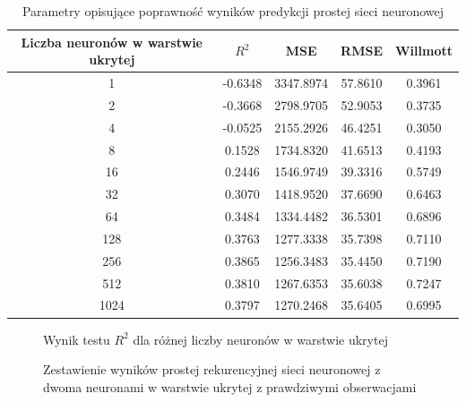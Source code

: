 \documentclass[10pt,a4paper]{article}
\begin{document}
\begin{table}[h!]
	\centering
	\begin{tabular}{|c|c|c|c|c|}
		\hline
		Liczba neuronów w warstwie ukrytej & $R^2$ & MSE & RMSE & Willmott \\
		\hline
		1    & -0.6348 & 3347.8974 & 57.8610 & 0.3961 \\
		2    & -0.3668 & 2798.9705 & 52.9053 & 0.3735 \\
		4    & -0.0525 & 2155.2926 & 46.4251 & 0.3050 \\
		8    & 0.1528  & 1734.8320 & 41.6513 & 0.4193 \\
		16   & 0.2446  & 1546.9749 & 39.3316 & 0.5749 \\
		32   & 0.3070  & 1418.9520 & 37.6690 & 0.6463 \\
		64   & 0.3484  & 1334.4482 & 36.5301 & 0.6896 \\
		128  & 0.3763  & 1277.3338 & 35.7398 & 0.7110 \\
		256  & 0.3865  & 1256.3483 & 35.4450 & 0.7190 \\
		512  & 0.3810  & 1267.6353 & 35.6038 & 0.7247 \\
		1024 & 0.3797  & 1270.2468 & 35.6405 & 0.6995 \\
		\hline
	\end{tabular}
	\caption{Parametry opisujące poprawność wyników predykcji prostej sieci neuronowej}
	\label{table:simpleRNN}
\end{table}
\begin{figure}[!ht]
	\centering
	\caption{Wynik testu $R^2$ dla różnej liczby neuronów w warstwie ukrytej}
	\label{figure:simple_rnn_neurons}
\end{figure}
\FloatBarrier
 \begin{figure}[!ht]
	\centering
	\caption{Zestawienie wyników prostej rekurencyjnej sieci neuronowej z dwoma neuronami w warstwie ukrytej z prawdziwymi obserwacjami}
	\label{figure:simple_rnn_2}
\end{figure}
\end{document}
